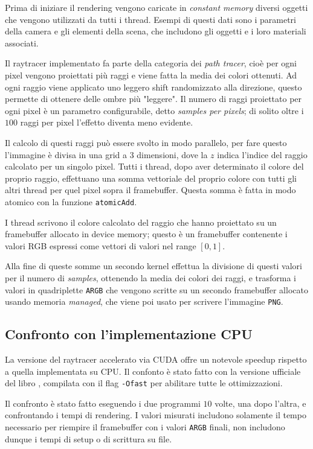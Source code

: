 \documentclass[12pt, twoside]{article}
\begin{document}
Prima di iniziare il rendering vengono caricate in \textit{constant memory}
diversi oggetti che vengono utilizzati da tutti i thread.
Esempi di questi dati sono i parametri della camera e gli elementi della
scena, che includono gli oggetti e i loro materiali associati.

Il raytracer implementato fa parte della categoria dei \textit{path tracer},
cioè per ogni pixel vengono proiettati più raggi e viene fatta la media dei
colori ottenuti.
Ad ogni raggio viene applicato uno leggero shift randomizzato alla direzione,
questo permette di ottenere delle ombre più "leggere".
Il numero di raggi proiettato per ogni pixel è un parametro configurabile,
detto \textit{samples per pixels}; di solito oltre i $100$ raggi per pixel
l'effetto diventa meno evidente.

Il calcolo di questi raggi può essere svolto in modo parallelo, per fare
questo l'immagine è divisa in una grid a 3 dimensioni, dove la $z$ indica
l'indice del raggio calcolato per un singolo pixel.
Tutti i thread, dopo aver determinato il colore del proprio raggio, effettuano
una somma vettoriale del proprio colore con tutti gli altri thread per quel
pixel sopra il framebuffer.
Questa somma è fatta in modo atomico con la funzione \texttt{atomicAdd}.

I thread scrivono il colore calcolato del raggio che hanno proiettato su un
framebuffer allocato in device memory; questo è un framebuffer contenente i
valori RGB espressi come vettori di valori nel range $[0, 1]$.

Alla fine di queste somme un secondo kernel effettua la divisione di questi
valori per il numero di \textit{samples}, ottenendo la media dei colori dei
raggi, e trasforma i valori in quadriplette \texttt{ARGB} che vengono scritte
su un secondo framebuffer allocato usando memoria \textit{managed}, che viene
poi usato per scrivere l'immagine \texttt{PNG}.

\subsection{Confronto con l'implementazione CPU}
La versione del raytracer accelerato via CUDA offre un notevole speedup
rispetto a quella implementata su CPU.
Il confonto è stato fatto con la versione ufficiale del libro
\cite{raytracingin1weekend_src}, compilata con il flag \texttt{-Ofast} per
abilitare tutte le ottimizzazioni.

Il confronto è stato fatto eseguendo i due programmi $10$ volte, una dopo
l'altra, e confrontando i tempi di rendering.
I valori misurati includono solamente il tempo necessario per riempire il
framebuffer con i valori \texttt{ARGB} finali, non includono dunque i tempi
di setup o di scrittura su file.
\end{document}
